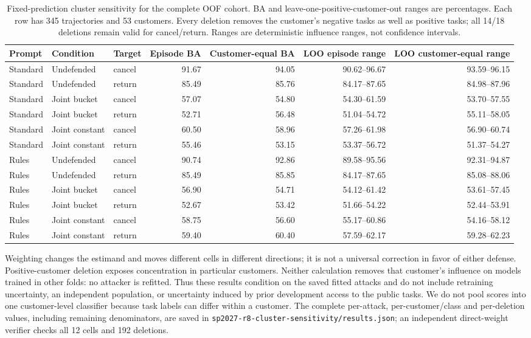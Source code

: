 \begin{table}[ht]\centering\footnotesize
\caption{Fixed-prediction cluster sensitivity for the complete OOF cohort. BA and leave-one-positive-customer-out ranges are percentages. Each row has 345 trajectories and 53 customers. Every deletion removes the customer's negative tasks as well as positive tasks; all 14/18 deletions remain valid for cancel/return. Ranges are deterministic influence ranges, not confidence intervals.}\label{tab:r8-cluster-sensitivity}
\begin{tabular}{@{}lllrrrr@{}}\toprule
Prompt & Condition & Target & Episode BA & Customer-equal BA & LOO episode range & LOO customer-equal range\\\midrule
Standard & Undefended & cancel & 91.67 & 94.05 & 90.62--96.67 & 93.59--96.15\\
Standard & Undefended & return & 85.49 & 85.76 & 84.17--87.65 & 84.98--87.96\\
Standard & Joint bucket & cancel & 57.07 & 54.80 & 54.30--61.59 & 53.70--57.55\\
Standard & Joint bucket & return & 52.71 & 56.48 & 51.04--54.72 & 55.11--58.05\\
Standard & Joint constant & cancel & 60.50 & 58.96 & 57.26--61.98 & 56.90--60.74\\
Standard & Joint constant & return & 55.46 & 53.15 & 53.37--56.72 & 51.37--54.27\\
Rules & Undefended & cancel & 90.74 & 92.86 & 89.58--95.56 & 92.31--94.87\\
Rules & Undefended & return & 85.49 & 85.85 & 84.17--87.65 & 85.08--88.06\\
Rules & Joint bucket & cancel & 56.90 & 54.71 & 54.12--61.42 & 53.61--57.45\\
Rules & Joint bucket & return & 52.67 & 53.42 & 51.66--54.22 & 52.44--53.91\\
Rules & Joint constant & cancel & 58.75 & 56.60 & 55.17--60.86 & 54.16--58.12\\
Rules & Joint constant & return & 59.40 & 60.40 & 57.59--62.17 & 59.28--62.23\\
\bottomrule\end{tabular}\end{table}

Weighting changes the estimand and moves different cells in different directions; it is not a universal correction in favor of either defense. Positive-customer deletion exposes concentration in particular customers. Neither calculation removes that customer's influence on models trained in other folds: no attacker is refitted. Thus these results condition on the saved fitted attacks and do not include retraining uncertainty, an independent population, or uncertainty induced by prior development access to the public tasks. We do not pool scores into one customer-level classifier because task labels can differ within a customer. The complete per-attack, per-customer/class and per-deletion values, including remaining denominators, are saved in \texttt{sp2027-r8-cluster-sensitivity/results.json}; an independent direct-weight verifier checks all 12 cells and 192 deletions.

